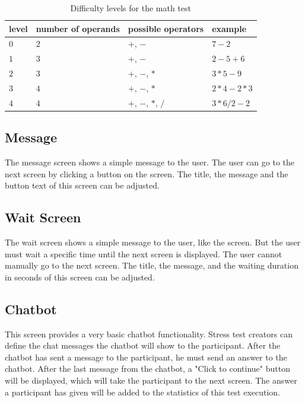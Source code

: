 \begin{table}[ht]
  \begin{tabularx}{\textwidth}{l|l|l|l}
    level & number of operands & possible operators & example \\
    \hline
    $0$ & $2$ & $+$, $-$ & $7-2$ \\
    $1$ & $3$ & $+$, $-$ & $2-5+6$ \\
    $2$ & $3$ & $+$, $-$, $*$ & $3*5-9$ \\
    $3$ & $4$ & $+$, $-$, $*$ & $2*4-2*3$ \\
    $4$ & $4$ & $+$, $-$, $*$, $/$ & $3*6/2-2$ \\
  \end{tabularx}
  \caption{Difficulty levels for the math test}
  \label{tab:math-test-difficulty}
\end{table}

\subsection{Message}
\label{sec:screens-message}
The message screen shows a simple message to the user.
The user can go to the next screen by clicking a button on the screen.
The title, the message and the button text of this screen can be adjusted.

\subsection{Wait Screen}
\label{sec:screens-wait-screen}
The wait screen shows a simple message to the user, like the  screen.
But the user must wait a specific time until the next screen is displayed.
The user cannot manually go to the next screen.
The title, the message, and the waiting duration in seconds of this screen can be adjusted.

\subsection{Chatbot}
\label{sec:screens-chatbot}
This screen provides a very basic chatbot functionality.
Stress test creators can define the chat messages the chatbot will show to the participant.
After the chatbot has sent a message to the participant, he must send an answer to the chatbot.
After the last message from the chatbot, a "Click to continue" button will be displayed, which will take the participant to the next screen.
The answer a participant has given will be added to the statistics of this test execution.

